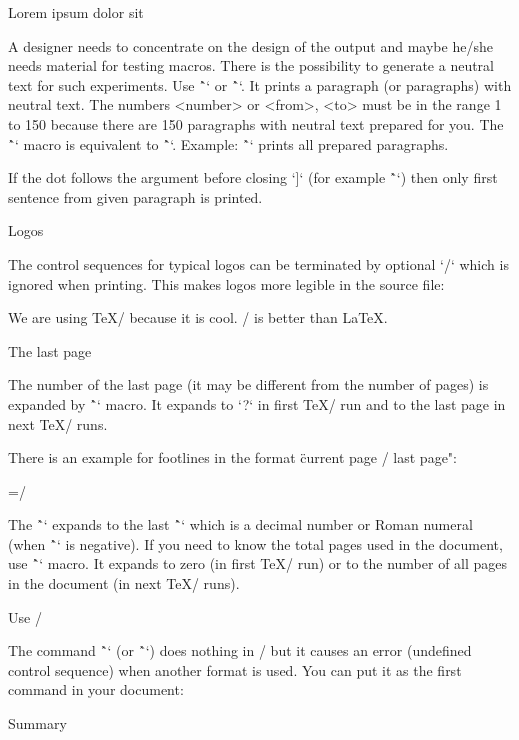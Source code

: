 {\secc Lorem ipsum dolor sit

\new
A designer needs to concentrate on the design of the output and maybe he/she
needs material for testing macros. There is the possibility to generate a
neutral text for such experiments. Use \^`\lorem[<number>]` or
\^`\lorem[<from>-<to>]`. It prints a paragraph (or paragraphs) with neutral
text. The numbers <number> or <from>, <to> must be in the range 1 to 150
because there are 150 paragraphs with neutral text prepared for you.
The \^`\lipsum` macro is equivalent to \^`\lorem`. Example: \^`\lipsum[1-150]`
prints all prepared paragraphs.

If the dot follows the argument before closing `]` (for example \^`\lipsum[3.]`)
then only first sentence from given paragraph is printed.

\secc Logos

\new
The control sequences for typical logos can be terminated by optional `/`
which is ignored when printing. This makes logos more legible in the source file:

\begtt
We are using \TeX/ because it is cool. \OpTeX/ is better than \LaTeX.
\endtt

\secc The last page

The number of the last page (it may be different from the number of pages) is
expanded by \^`\lastpage` macro. It expands to `?` in first \TeX/ run and to
the last page in next \TeX/ runs.

There is an example for footlines in the format \"current page / last page":

\begtt
\footline={\hss \fixedrm \folio/\lastpage \hss}
\endtt

\new
The \^`\lastpage` expands to the last \^`\folio` which is a decimal
number or Roman numeral (when \^`\pageno` is negative). If you need to know
the total pages used in the document, use \^`\totalpages` macro. It expands to
zero (in first \TeX/ run) or to the number of all pages in the document
(in next \TeX/ runs).

\secc Use \OpTeX/

\new
The command \^`\useOpTeX` (or \^`\useoptex`) does nothing in \OpTeX/ but it causes
an error (undefined control sequence) when another format is used. You can
put it as the first command in your document:

\begtt
\useOpTeX %
\endtt

\sec Summary

}
